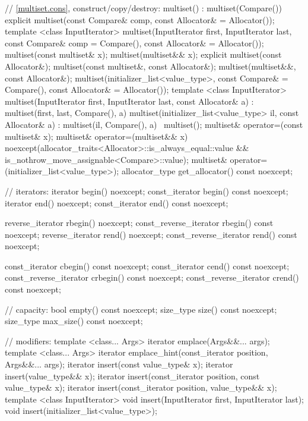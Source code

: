 \begin{codeblock}
{{    // \ref{multiset.cons}, construct/copy/destroy:
    multiset() : multiset(Compare()) { }
    explicit multiset(const Compare& comp, const Allocator& = Allocator());
    template <class InputIterator>
      multiset(InputIterator first, InputIterator last,
               const Compare& comp = Compare(), const Allocator& = Allocator());
    multiset(const multiset& x);
    multiset(multiset&& x);
    explicit multiset(const Allocator&);
    multiset(const multiset&, const Allocator&);
    multiset(multiset&&, const Allocator&);
    multiset(initializer_list<value_type>, const Compare& = Compare(),
             const Allocator& = Allocator());
    template <class InputIterator>
      multiset(InputIterator first, InputIterator last, const Allocator& a)
        : multiset(first, last, Compare(), a) { }
    multiset(initializer_list<value_type> il, const Allocator& a)
      : multiset(il, Compare(), a) { }
    ~multiset();
    multiset& operator=(const multiset& x);
    multiset& operator=(multiset&& x)
      noexcept(allocator_traits<Allocator>::is_always_equal::value &&
               is_nothrow_move_assignable<Compare>::value);
    multiset& operator=(initializer_list<value_type>);
    allocator_type get_allocator() const noexcept;

    // iterators:
    iterator               begin() noexcept;
    const_iterator         begin() const noexcept;
    iterator               end() noexcept;
    const_iterator         end() const noexcept;

    reverse_iterator       rbegin() noexcept;
    const_reverse_iterator rbegin() const noexcept;
    reverse_iterator       rend() noexcept;
    const_reverse_iterator rend() const noexcept;

    const_iterator         cbegin() const noexcept;
    const_iterator         cend() const noexcept;
    const_reverse_iterator crbegin() const noexcept;
    const_reverse_iterator crend() const noexcept;

    // capacity:
    bool      empty() const noexcept;
    size_type size() const noexcept;
    size_type max_size() const noexcept;

    // modifiers:
    template <class... Args> iterator emplace(Args&&... args);
    template <class... Args> iterator emplace_hint(const_iterator position, Args&&... args);
    iterator insert(const value_type& x);
    iterator insert(value_type&& x);
    iterator insert(const_iterator position, const value_type& x);
    iterator insert(const_iterator position, value_type&& x);
    template <class InputIterator>
      void insert(InputIterator first, InputIterator last);
    void insert(initializer_list<value_type>);

}}
\end{codeblock}
